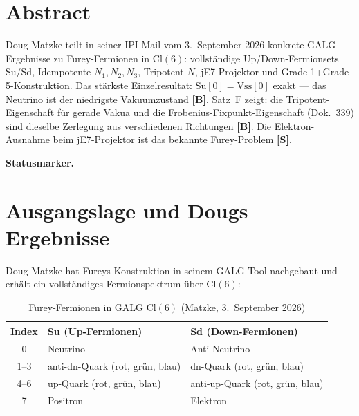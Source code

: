
\providecommand{\BM}{\textbf{[B]}}
\providecommand{\KM}{\textbf{[K]}}
\providecommand{\SM}{\textbf{[S]}}
\providecommand{\XM}{\textbf{[X]}}

{}

\section*{Abstract}

Doug Matzke teilt in seiner IPI-Mail vom 3.~September 2026 konkrete GALG-Ergebnisse zu
Furey-Fermionen in Cl$(6)$: vollst\"andige Up/Down-Fermionsets Su/Sd, Idempotente $N_1,N_2,N_3$,
Tripotent $N$, jE7-Projektor und Grade-1+Grade-5-Konstruktion. Das st\"arkste Einzelresultat:
$\mathrm{Su}[0] = \mathrm{Vss}[0]$ exakt --- das Neutrino ist der niedrigste Vakuumzustand
\BM. Satz~F zeigt: die Tripotent-Eigenschaft f\"ur gerade Vakua und die Frobenius-Fixpunkt-Eigenschaft
(Dok.~339) sind dieselbe Zerlegung aus verschiedenen Richtungen \BM.
Die Elektron-Ausnahme beim jE7-Projektor ist das bekannte Furey-Problem \SM.

\medskip\noindent\textbf{Statusmarker.}


\section{Ausgangslage und Dougs Ergebnisse}

Doug Matzke hat Fureys Konstruktion in seinem GALG-Tool nachgebaut und erh\"alt
ein vollst\"andiges Fermionspektrum \"uber Cl$(6)$:

\begin{table}[H]
\centering
\caption{Furey-Fermionen in GALG Cl$(6)$ (Matzke, 3.~September 2026)}
\begin{tabular}{cll}
\toprule
Index & Su (Up-Fermionen) & Sd (Down-Fermionen) \\
\midrule
0 & Neutrino & Anti-Neutrino \\
1--3 & anti-dn-Quark (rot, gr\"un, blau) & dn-Quark (rot, gr\"un, blau) \\
4--6 & up-Quark (rot, gr\"un, blau) & anti-up-Quark (rot, gr\"un, blau) \\
7 & Positron & Elektron \\
\bottomrule
\end{tabular}
\end{table}

